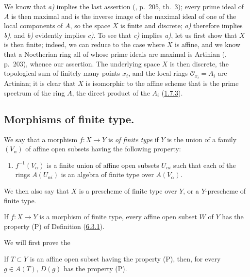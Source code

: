We know that \emph{a)} implies the last assertion (\cite{I-13}, p.~205, th.~3);
every prime ideal of $A$ is then maximal and is the inverse image of the
maximal ideal of one of the local components of $A$, so the space $X$ is
finite and discrete; \emph{a)} therefore implies \emph{b)}, and \emph{b)} evidently implies \emph{c)}. To
see that \emph{c)} implies \emph{a)}, let us first show that $X$ is then finite; indeed, we
can reduce to the case where $X$ is affine, and we know that a Noetherian
ring all of whose prime ideals are maximal is Artinian (\cite{I-13}, p.~203),
whence our assertion. The underlying space $X$ is then discrete, the
topological sum of finitely many points $x_i$, and the local rings
$\mathscr{O}_{x_i}=A_i$ are Artinian; it is clear that $X$ is isomorphic to
the affine scheme that is the prime spectrum of the ring $A$, the direct
product of the $A_i$ (\hyperref[I.1.7.3]{1.7.3}).

\subsection{Morphisms of finite type.}
\label{subsection:I.6.3}

\begin{definition}[6.3.1]
\label{I.6.3.1}
We say that a morphism $f:X\to Y$ is \emph{of finite type} if $Y$ is the union
of a family $(V_\alpha)$ of affine open subsets having the following property:
\begin{enumerate}
  \item[\textup{(P)}] $f^{-1}(V_\alpha)$ is a finite union of affine open subsets
    $U_{\alpha i}$ such that each of the rings $A(U_{\alpha i})$ is an
    algebra of finite type over $A(V_\alpha)$.
\end{enumerate}
We then also say that $X$ is a prescheme of finite type over $Y$, or a
$Y$-prescheme of finite type.
\end{definition}

\begin{proposition}[6.3.2]
\label{I.6.3.2}
If $f:X\to Y$ is a morphism of finite type, every affine open subset $W$ of
$Y$ has the property \textup{(P)} of Definition \textup{(\hyperref[I.6.3.1]{6.3.1})}.
\end{proposition}

We will first prove the

\begin{lemma}[6.3.2.1]
\label{I.6.3.2.1}
If $T\subset Y$ is an affine open subset having the property \textup{(P)}, then, for
every $g\in A(T)$, $D(g)$ has the property \textup{(P)}.
\end{lemma}

